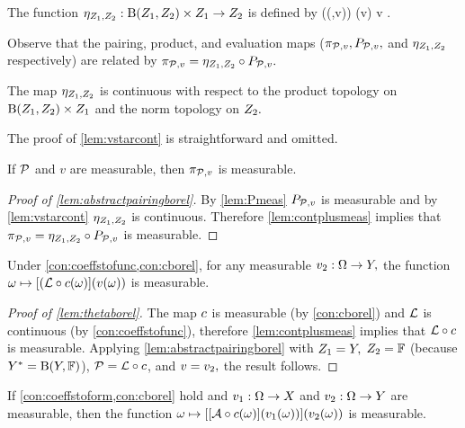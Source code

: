 The function $\evalZoZt:\homspaceZoZt \times \Zo \rightarrow \Zt$ is defined by
\beq\label{eq:evaldef}
\evalZoZt\big(\mleft(\cH,v\mright)\big) \de \cH(v) \quad\tfor \cH \in \homspaceZoZt \tand v \in \Zo.
\eeq
\ede

Observe that the pairing, product, and evaluation maps ($\pi_{\mathcal P,v}, P_{\mathcal P,v},$ and $\eta_{Z_{1},Z_{2}}$ respectively) are related by $\pi_{\mathcal P,v} = \eta_{Z_{1},Z_{2}} \circ P_{\mathcal P,v}.$

\label{lem:vstarcont}
The map $\eta_{Z_{1},Z_{2}}$ is continuous with respect to the product topology on $\homspaceZoZt \times \Zo$ and the norm topology on $Z_{2}.$
\ele

The proof of \cref{lem:vstarcont} is straightforward and omitted.

 \label{lem:abstractpairingborel}
If  $\mathcal P$ and $v$ are measurable, then $\pi_{\mathcal P,v}$ is measurable.
\ele

\begin{proof}[Proof of \cref{lem:abstractpairingborel}]
By \cref{lem:Pmeas} $P_{\mathcal P,v}$ is measurable and by \cref{lem:vstarcont} $\eta_{Z_{1},Z_{2}}$ is continuous. Therefore \cref{lem:contplusmeas} implies that $\pi_{\mathcal P,v} = \eta_{Z_{1},Z_{2}} \circ P_{\mathcal P,v}$ is measurable.
 \end{proof}


 \label{lem:thetaborel}
Under \cref{con:coeffstofunc,con:cborel}, for any measurable $v_{2}:\Omega\rightarrow Y,$ the function $\omega \mapsto \mleft[(\rhs\circ\coeff(\omega)\mright]\mleft(v(\omega)\mright)$ is measurable.
\ele

\begin{proof}[Proof of \cref{lem:thetaborel}]
The map $c$ is measurable (by \cref{con:cborel}) and $\mathcal L$ is continuous  (by \cref{con:coeffstofunc}), therefore \cref{lem:contplusmeas} implies that $\mathcal L\circ c $ is measurable. Applying \cref{lem:abstractpairingborel} with $Z_{1} = Y,$ $Z_{2}=\mathbb F$ (because $\Ys = \homspaceYF$), $\mathcal P = \mathcal L \circ c$, and $v = v_{2},$ the result follows.
\end{proof}


 \label{lem:gammaborel}
If \cref{con:coeffstoform,con:cborel} hold and $v_{1}:\Omega \rightarrow X$ and $v_{2}:\Omega \rightarrow Y$ are measurable, then the function $\omega \mapsto \mleft[\mleft[\toform\circ\coeff(\omega)\mright]\mleft(\vo(\omega)\mright)\mright]\mleft(\vt(\omega)\mright)$ is measurable.
\ele

